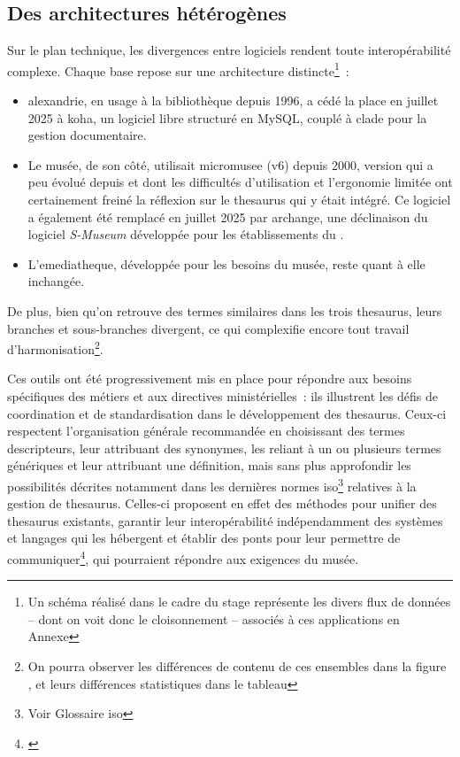 \subsection{Des architectures hétérogènes}

Sur le plan technique, les divergences entre logiciels rendent toute interopérabilité complexe. Chaque base repose sur une architecture distincte\footnote{Un schéma réalisé dans le cadre du stage représente les divers flux de données -- dont on voit donc le cloisonnement -- associés à ces applications en Annexe }~:
\begin{itemize}
	\item \gls{alexandrie}, en usage à la bibliothèque depuis 1996, a cédé la place en juillet 2025 à \gls{koha}, un logiciel libre structuré en MySQL, couplé à \gls{clade} pour la gestion documentaire.
	\item Le musée, de son côté, utilisait \gls{micromusee} (v6) depuis 2000, version qui a peu évolué depuis et dont les difficultés d'utilisation et l'ergonomie limitée ont certainement freiné la réflexion sur le \gls{thesaurus} qui y était intégré. Ce logiciel a également été remplacé en juillet 2025 par \gls{archange}, une déclinaison du logiciel \textit{S-Museum} développée pour les établissements du \minarm.
	\item L'\gls{emediatheque}, développée pour les besoins du musée, reste quant à elle inchangée.
\end{itemize}

De plus, bien qu'on retrouve des termes similaires dans les trois \gls{thesaurus}, leurs branches et sous-branches divergent, ce qui complexifie encore tout travail d'harmonisation\footnote{On pourra observer les différences de contenu de ces ensembles dans la figure , et leurs différences statistiques dans le tableau }.


\bigskip

Ces outils ont été progressivement mis en place pour répondre aux besoins spécifiques des métiers et aux directives ministérielles~: ils illustrent les défis de coordination et de standardisation dans le développement des \gls{thesaurus}. Ceux-ci respectent l'organisation générale recommandée en choisissant des termes descripteurs, leur attribuant des synonymes, les reliant à un ou plusieurs termes génériques et leur attribuant une définition, mais sans plus approfondir les possibilités décrites notamment dans les dernières normes \gls{iso}\footnote{Voir Glossaire \gls{iso}} relatives à la gestion de \gls{thesaurus}. Celles-ci proposent en effet des méthodes pour unifier des \gls{thesaurus} existants, garantir leur interopérabilité indépendamment des systèmes et langages qui les hébergent et établir des ponts pour leur permettre de communiquer\footnote{\cite{chichereauNormesConceptionGestion2007}}, qui pourraient répondre aux exigences du musée.


